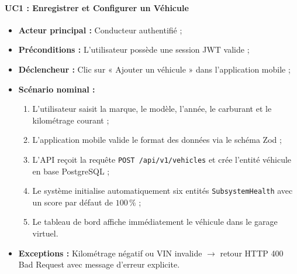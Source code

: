 \documentclass[12pt,a4paper,oneside]{report}
\newcommand{\bpuce}{\textcolor{midBlue}{$\blacktriangleright$}\;}
\begin{document}
\paragraph{UC1 : Enregistrer et Configurer un V\'ehicule}
\begin{itemize}[label=\bpuce]
  \item \textbf{Acteur principal :} Conducteur authentifi\'e ;
  \item \textbf{Pr\'econditions :} L'utilisateur poss\`ede une session JWT valide ;
  \item \textbf{D\'eclencheur :} Clic sur « Ajouter un v\'ehicule » dans l'application mobile ;
  \item \textbf{Sc\'enario nominal :}
    \begin{enumerate}
      \item L'utilisateur saisit la marque, le mod\`ele, l'ann\'ee, le carburant et le kilom\'etrage courant ;
      \item L'application mobile valide le format des donn\'ees via le sch\'ema Zod ;
      \item L'API re\c{c}oit la requ\^ete \texttt{POST /api/v1/vehicles} et cr\'ee l'entit\'e v\'ehicule en base PostgreSQL ;
      \item Le syst\`eme initialise automatiquement six entit\'es \texttt{SubsystemHealth} avec un score par d\'efaut de $100\,\%$ ;
      \item Le tableau de bord affiche imm\'ediatement le v\'ehicule dans le garage virtuel.
    \end{enumerate}
  \item \textbf{Exceptions :} Kilom\'etrage n\'egatif ou VIN invalide $\rightarrow$ retour HTTP 400 Bad Request avec message d'erreur explicite.
\end{itemize}
\end{document}

